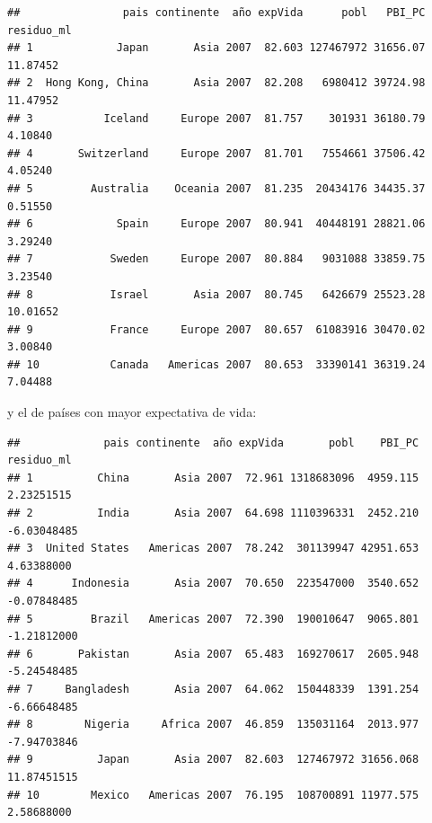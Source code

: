 \documentclass[]{book}
\newenvironment{Shaded}{\begin{snugshade}}{\end{snugshade}}
\newcommand{\KeywordTok}[1]{\textcolor[rgb]{0.13,0.29,0.53}{\textbf{#1}}}
\newcommand{\DataTypeTok}[1]{\textcolor[rgb]{0.13,0.29,0.53}{#1}}
\newcommand{\DecValTok}[1]{\textcolor[rgb]{0.00,0.00,0.81}{#1}}
\newcommand{\StringTok}[1]{\textcolor[rgb]{0.31,0.60,0.02}{#1}}
\newcommand{\OperatorTok}[1]{\textcolor[rgb]{0.81,0.36,0.00}{\textbf{#1}}}
\newcommand{\NormalTok}[1]{#1}
\begin{document}
\begin{verbatim}
##                pais continente  año expVida      pobl   PBI_PC residuo_ml
## 1             Japan       Asia 2007  82.603 127467972 31656.07   11.87452
## 2  Hong Kong, China       Asia 2007  82.208   6980412 39724.98   11.47952
## 3           Iceland     Europe 2007  81.757    301931 36180.79    4.10840
## 4       Switzerland     Europe 2007  81.701   7554661 37506.42    4.05240
## 5         Australia    Oceania 2007  81.235  20434176 34435.37    0.51550
## 6             Spain     Europe 2007  80.941  40448191 28821.06    3.29240
## 7            Sweden     Europe 2007  80.884   9031088 33859.75    3.23540
## 8            Israel       Asia 2007  80.745   6426679 25523.28   10.01652
## 9            France     Europe 2007  80.657  61083916 30470.02    3.00840
## 10           Canada   Americas 2007  80.653  33390141 36319.24    7.04488
\end{verbatim}

y el de países con mayor expectativa de vida:

\begin{Shaded}
\end{Shaded}

\begin{verbatim}
##             pais continente  año expVida       pobl    PBI_PC  residuo_ml
## 1          China       Asia 2007  72.961 1318683096  4959.115  2.23251515
## 2          India       Asia 2007  64.698 1110396331  2452.210 -6.03048485
## 3  United States   Americas 2007  78.242  301139947 42951.653  4.63388000
## 4      Indonesia       Asia 2007  70.650  223547000  3540.652 -0.07848485
## 5         Brazil   Americas 2007  72.390  190010647  9065.801 -1.21812000
## 6       Pakistan       Asia 2007  65.483  169270617  2605.948 -5.24548485
## 7     Bangladesh       Asia 2007  64.062  150448339  1391.254 -6.66648485
## 8        Nigeria     Africa 2007  46.859  135031164  2013.977 -7.94703846
## 9          Japan       Asia 2007  82.603  127467972 31656.068 11.87451515
## 10        Mexico   Americas 2007  76.195  108700891 11977.575  2.58688000
\end{verbatim}
\end{document}
